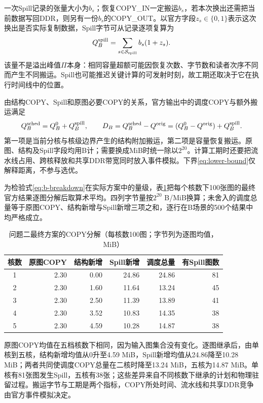 一次Spill记录的张量大小为$b_s$；恢复COPY\_IN一定搬运$b_s$，若本次换出还需把当前数据写回DDR，则另有一份$b_s$的COPY\_OUT。以官方字段$z_s\in\{0,1\}$表示这次换出是否实际复制数据，Spill字节可从记录逐项复算为
\begin{equation}
Q_B^{\rm spill}=\sum_{s\in\mathcal S_{\rm spill}} b_s(1+z_s).
\label{eq:b-spill}
\end{equation}
该量不是溢出峰值$\Pi$本身：相同容量超额可能因恢复次数、字节数和读者次序不同而产生不同搬运。Spill也可能推迟关键计算的可发射时刻，故工期还取决于它在执行时间线中的位置。

由结构COPY、Spill和原图必要COPY的关系，官方输出中的调度COPY与额外搬运满足
\begin{equation}
Q_B^{\rm sched}=Q_B^0+Q_B^{\rm spill},\qquad
D_B=Q_B^{\rm sched}-Q^{\rm orig}
=(Q_B^0-Q^{\rm orig})+Q_B^{\rm spill}.
\label{eq:b-breakdown}
\end{equation}
第一项是当前分核与核级边界产生的结构附加搬运，第二项是容量恢复搬运。原图、结构及Spill字段均用B计；需要换成MiB时统一除以$2^{20}$。计算工期时还要把流水线占用、跨核释放和共享DDR带宽同时放入事件模拟。下界\eqref{eq:lower-bound}仅解释距离，不参与选优。

为检验式\eqref{eq:b-breakdown}在实际方案中的量级，表\ref{tab:b-copy-ledger}把每个核数下100张图的最终官方结果逐图分解后取算术平均。四列字节量按$2^{20}$ B/MiB换算；未舍入的调度总量等于原图COPY、结构新增与Spill新增三项之和，逐行在B场景的500个结果中均严格成立。

\begin{table}[H]\centering\small
\caption{问题二最终方案的COPY分解（每核数100图；字节列为逐图均值，MiB）}\label{tab:b-copy-ledger}
\begin{tabular}{crrrrr}\toprule
核数 & 原图COPY & 结构新增 & Spill新增 & 调度总量 & 有Spill图数\\\midrule
1 & 2.30 & 0.00 & 24.86 & 24.86 & 81\\
2 & 2.30 & 1.60 & 11.64 & 13.24 & 45\\
3 & 2.30 & 2.50 & 11.39 & 13.89 & 41\\
4 & 2.30 & 3.52 & 10.83 & 14.35 & 38\\
5 & 2.30 & 4.59 & 10.28 & 14.87 & 38\\\bottomrule
\end{tabular}\end{table}

原图COPY均值在五档核数下相同，因为输入图集合没有变化。逐图继承后，由单核到五核，结构新增均值从0升至4.59 MiB，Spill新增均值从24.86降至10.28 MiB；两者共同使调度COPY总量在二核时降至13.24 MiB，五核为14.87 MiB。单核有81张图发生Spill，五核有38张；这些差异来自不同核数下继承的计划和物理驻留过程。搬运字节与工期是两个指标，COPY所处时间、流水线和共享DDR竞争由官方事件模拟决定。

